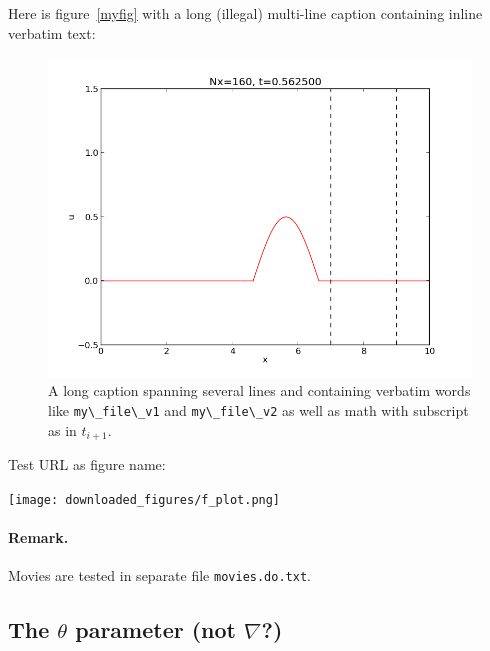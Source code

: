 \n\documentclass[%
oneside,                 %
final,                   %
10pt]{article}
\theoremstyle{definition}
\begin{document}
\begin{enumerate}
Here is figure~\vref{myfig} with a long (illegal) multi-line caption
containing inline verbatim text:

\begin{figure}
  \centering
  \includegraphics[width=0.9\linewidth]{testfigs/wave1D.png}
  \caption{
  A long caption spanning several lines and containing verbatim words like \protect \Verb!my\_file\_v1! and \protect \Verb!my\_file\_v2! as well as math with subscript as in $t_{i+1}$. \label{myfig}
  }
\end{figure}


Test URL as figure name:

\vspace{6mm}

\centerline{\texttt{[image: downloaded\_figures/f\_plot.png]}}

\vspace{6mm}


\paragraph{Remark.}
Movies are tested in separate file \texttt{movies.do.txt}.


\subsection{The $\theta$ parameter (not $\nabla$?)}
\label{decay:sec:theta}


\end{enumerate}
\end{document}
